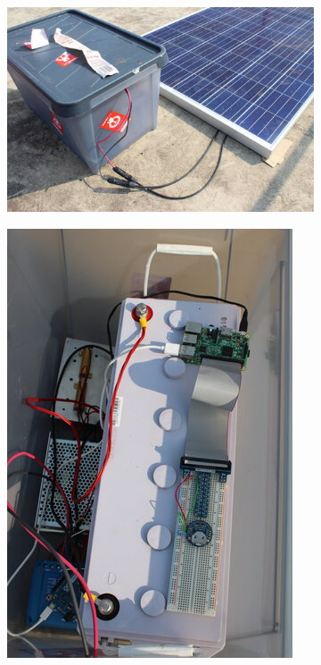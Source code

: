 \begin{figure}
	\centering
	\begin{subfigure}[t]{0.56\textwidth}
		\centering
		\includegraphics[width=\linewidth]{Figures/rooftop1} 
		\caption{} \label{Fig:rooftop1}
	\end{subfigure}
	\hfill
	\begin{subfigure}[t]{0.4\textwidth}
		\centering
		\includegraphics[width=\linewidth]{Figures/rooftop2}

\end{subfigure}
\end{figure}
